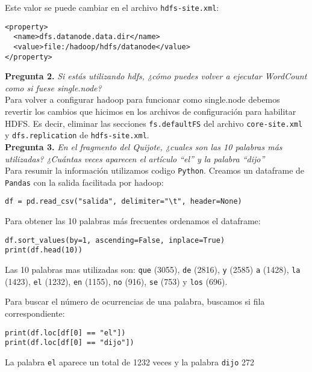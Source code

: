 \documentclass[11pt]{article}
\begin{document}
Este valor se puede cambiar en el archivo \texttt{hdfs-site.xml}:

\begin{verbatim}
<property>
  <name>dfs.datanode.data.dir</name>
  <value>file:/hadoop/hdfs/datanode</value>
</property>
\end{verbatim}

\textbf{Pregunta 2. }\emph{Si estás utilizando hdfs, ¿cómo puedes volver a ejecutar WordCount como si fuese single.node?}\\

Para volver a configurar hadoop para funcionar como single.node debemos revertir los cambios que hicimos en los archivos de configuración para habilitar HDFS. Es decir, eliminar las secciones \texttt{fs.defaultFS} del archivo \texttt{core-site.xml} y \texttt{dfs.replication} de \texttt{hdfs-site.xml}.\\


\textbf{Pregunta 3. }\emph{En el fragmento del Quijote, ¿cuales son las 10 palabras más utilizadas? ¿Cuántas veces aparecen el artículo ``el'' y la palabra ``dijo''}\\

Para resumir la información utilizamos codigo \texttt{Python}. Creamos un dataframe de \texttt{Pandas} con la salida facilitada por hadoop:
\begin{verbatim}
df = pd.read_csv("salida", delimiter="\t", header=None)
\end{verbatim}

Para obtener las 10 palabras más frecuentes ordenamos el dataframe:
\begin{verbatim}
df.sort_values(by=1, ascending=False, inplace=True)
print(df.head(10))
\end{verbatim}

Las 10 palabras mas utilizadas son: \texttt{que} (3055), \texttt{de} (2816), \texttt{y} (2585) \texttt{a} (1428), \texttt{la} (1423), \texttt{el} (1232), \texttt{en} (1155), \texttt{no} (916), \texttt{se} (753) y \texttt{los} (696).

Para buscar el número de ocurrencias de una palabra, buscamos si fila correspondiente:
\begin{verbatim}
print(df.loc[df[0] == "el"])
print(df.loc[df[0] == "dijo"])
\end{verbatim}

La palabra \texttt{el} aparece un total de 1232 veces y la palabra \texttt{dijo} 272
\end{document}
